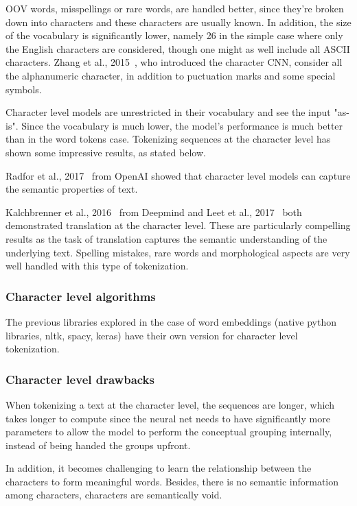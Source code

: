 OOV words, misspellings or rare words, are handled better, since they're broken down into characters and these characters are usually known. In addition, the size of the vocabulary is significantly lower, namely 26 in the simple case where only the English characters are considered, though one might as well include all ASCII characters. Zhang et al., 2015~\cite{zhang2015text}, who introduced the character CNN, consider all the alphanumeric character, in addition to puctuation marks and some special symbols.

Character level models are unrestricted in their vocabulary and see the input "as-is". Since the vocabulary is much lower, the model's performance is much better than in the word tokens case. Tokenizing sequences at the character level has shown some impressive results, as stated below.

Radfor et al., 2017~\cite{radford2017learning} from OpenAI showed that character level models can capture the semantic properties of text.

Kalchbrenner et al., 2016~\cite{kalchbrenner2016neural} from Deepmind and Leet et al., 2017~\cite{lee-etal-2017-fully} both demonstrated translation at the character level. These are particularly compelling results as the task of translation captures the semantic understanding of the underlying text. Spelling mistakes, rare words and morphological aspects are very well handled with this type of tokenization.

\subsubsection{Character level algorithms}

The previous libraries explored in the case of word embeddings (native python libraries, nltk, spacy, keras) have their own version for character level tokenization.

\subsubsection{Character level drawbacks}

When tokenizing a text at the character level, the sequences are longer, which takes longer to compute since the neural net needs to have significantly more parameters to allow the model to perform the conceptual grouping internally, instead of being handed the groups upfront.

In addition, it becomes challenging to learn the relationship between the characters to form meaningful words. Besides, there is no semantic information among characters, characters are semantically void.

